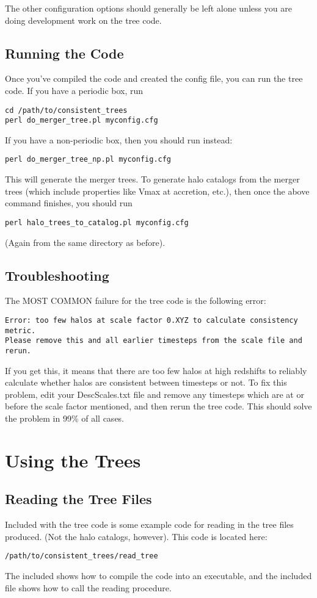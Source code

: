 \documentclass[12pt]{article}
\begin{document}
   The other configuration options should generally be left alone unless you are
      doing development work on the tree code.


 \subsection{Running the Code}
 \label{s:running}
      Once you've compiled the code and created the config file, you can
      run the tree code.  If you have a periodic box, run
\begin{verbatim}
cd /path/to/consistent_trees
perl do_merger_tree.pl myconfig.cfg
\end{verbatim}
      If you have a non-periodic box, then you should run instead:
\begin{verbatim}
perl do_merger_tree_np.pl myconfig.cfg
\end{verbatim}
      This will generate the merger trees.  To generate halo catalogs from the
      merger trees (which include properties like Vmax at accretion, etc.),
      then once the above command finishes, you should run
\begin{verbatim}
perl halo_trees_to_catalog.pl myconfig.cfg
\end{verbatim}
      (Again from the same directory as before).

\subsection{Troubleshooting}
      The MOST COMMON failure for the tree code is the following error:
\begin{verbatim}
Error: too few halos at scale factor 0.XYZ to calculate consistency metric.
Please remove this and all earlier timesteps from the scale file and rerun.
\end{verbatim}
      If you get this, it means that there are too few halos at high redshifts
      to reliably calculate whether halos are consistent between timesteps or
      not.  To fix this problem, edit your DescScales.txt file and remove any
      timesteps which are at or before the scale factor mentioned, and then
      rerun the tree code.  This should solve the problem in 99\% of all cases.
     
     \section{Using the Trees}
   \subsection{Reading the Tree Files}
      Included with the tree code is some example code for reading in the
      tree files produced.  (Not the halo catalogs, however).  This code
      is located here:
\begin{verbatim}
/path/to/consistent_trees/read_tree
\end{verbatim}
      The included  shows how to compile the code into an executable,
      and the included  file shows how to call the reading procedure.
\end{document}

